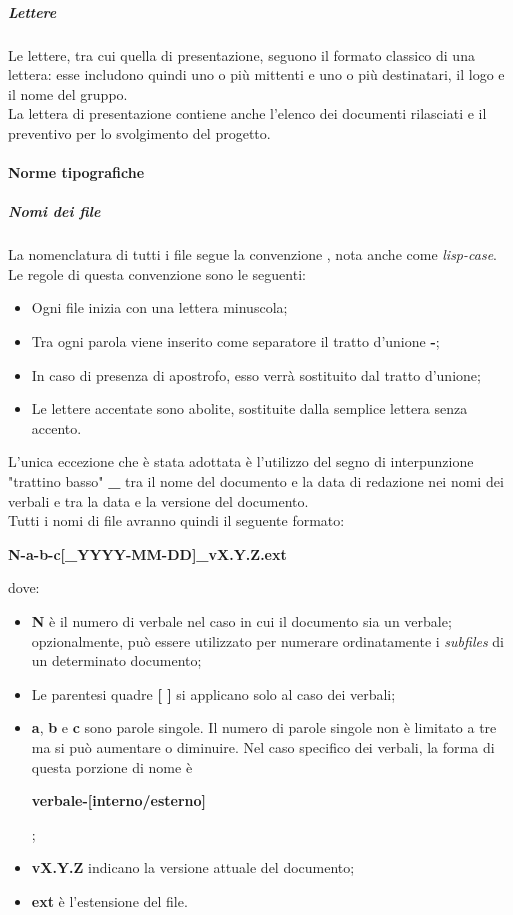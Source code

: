 \documentclass[../norme-di-progetto.tex]{subfiles}
\begin{document}
\subparagraph{Lettere}
Le lettere, tra cui quella di presentazione, seguono il formato classico di una lettera: esse includono quindi uno o più mittenti e uno o più destinatari, il logo e il nome del gruppo. \\
La lettera di presentazione contiene anche l'elenco dei documenti rilasciati e il preventivo per lo svolgimento del progetto.

\paragraph{Norme tipografiche}
\subparagraph{Nomi dei file}
La nomenclatura di tutti i file segue la convenzione , nota anche come \textit{lisp-case}. Le regole di questa convenzione sono le seguenti:
\begin{itemize}
  \item Ogni file inizia con una lettera minuscola;
  \item Tra ogni parola viene inserito come separatore il tratto d'unione \textbf{-};
  \item In caso di presenza di apostrofo, esso verrà sostituito dal tratto d'unione;
  \item Le lettere accentate sono abolite, sostituite dalla semplice lettera senza accento.
\end{itemize}
L'unica eccezione che è stata adottata è l'utilizzo del segno di interpunzione "trattino basso" \textbf{\_} tra il nome del documento e la data di redazione nei nomi dei verbali e tra la data e la versione del documento. \\
Tutti i nomi di file avranno quindi il seguente formato: \\ \begin{center}
  \centering
  \textbf{N-a-b-c[\_YYYY-MM-DD]\_vX.Y.Z.ext}
\end{center} dove:
\begin{itemize}
  \item \textbf{N} è il numero di verbale nel caso in cui il documento sia un verbale; opzionalmente, può essere utilizzato per numerare ordinatamente i \textit{subfiles} di un determinato documento;
  \item Le parentesi quadre \textbf{[ ]} si applicano solo al caso dei verbali;
  \item \textbf{a}, \textbf{b} e \textbf{c} sono parole singole. Il numero di parole singole non è limitato a tre ma si può aumentare o diminuire. Nel caso specifico dei verbali, la forma di questa porzione di nome è \\ \begin{center}
    \centering
    \textbf{verbale-[interno/esterno]}
  \end{center};
  \item \textbf{vX.Y.Z} indicano la versione attuale del documento;
  \item \textbf{ext} è l'estensione del file.
\end{itemize}
\end{document}
